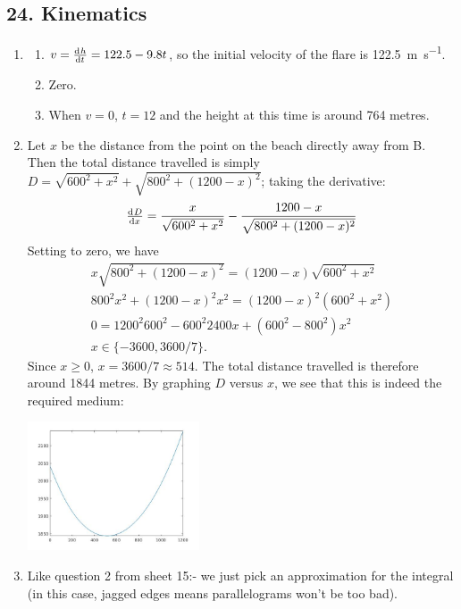 \subsection*{24. Kinematics}
\begin{enumerate}
  \item
    \begin{enumerate}
      \item $ v = \od{h}{t} = 122.5 - 9.8t $, so the initial velocity of the flare is \SI{122.5}{\metre\per\second}.
      \item Zero.
      \item When $ v = 0 $, $ t = 12 $ and the height at this time is around 764 metres.
    \end{enumerate}
  \item Let $ x $ be the distance from the point on the beach directly away from B. Then the total distance travelled
        is simply $ D = \sqrt{600^2 + x^2} + \sqrt{800^2 + (1200-x)^2} $; taking the derivative:
        \begin{displaymath}
          \od{D}{x} = \frac{x}{\sqrt{600^2 + x^2}} - \frac{1200 - x}{\sqrt{800^2 + (1200 - x)^2}}
        \end{displaymath}
        Setting to zero, we have
        \begin{gather*}
          x\sqrt{800^2 + (1200 - x)^2} = (1200 - x)\sqrt{600^2 + x^2}\\
          800^2 x^2 + (1200 - x)^2 x^2 = (1200 - x)^2 (600^2 + x^2)\\
          0 =  1200^2 600^2 - 600^2 2400x + (600^2 - 800^2) x^2\\
          x \in \{ -3600, 3600/7 \}.
        \end{gather*}
        Since $ x \geq 0 $, $ x = 3600/7 \approx 514 $. The total distance travelled is therefore around 1844 metres. By graphing $ D $ versus $ x $,
        we see that this is indeed the required medium:
        \begin{center}
          \includegraphics[width=0.4\textwidth]{swamp}
        \end{center}
  \item Like question 2 from sheet 15:- we just pick an approximation for the integral (in this case, jagged edges means parallelograms won't be too bad).
\end{enumerate}

